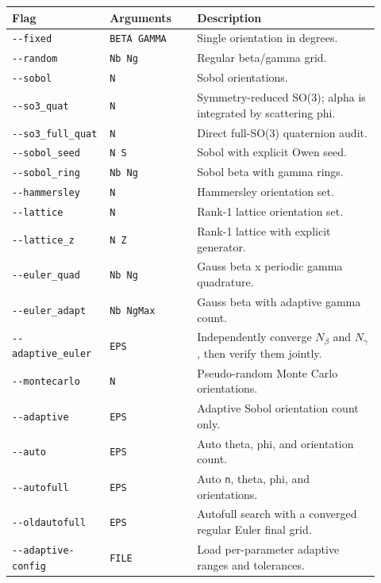 \documentclass[
  10pt,
  a4paper,
]{article}
\begin{document}
\begin{longtable}[]{@{}L{0.24\linewidth}L{0.22\linewidth}L{0.46\linewidth}@{}}
\toprule\noalign{}
Flag & Arguments & Description \\
\midrule\noalign{}
\endhead
\bottomrule\noalign{}
\endlastfoot
\texttt{-\/-fixed} & \texttt{BETA\ GAMMA} & Single orientation in
degrees. \\
\texttt{-\/-random} & \texttt{Nb\ Ng} & Regular beta/gamma grid. \\
\texttt{-\/-sobol} & \texttt{N} & Sobol orientations. \\
\texttt{-\/-so3\_quat} & \texttt{N} & Symmetry-reduced SO(3); alpha is
integrated by scattering phi. \\
\texttt{-\/-so3\_full\_quat} & \texttt{N} & Direct full-SO(3) quaternion
audit. \\
\texttt{-\/-sobol\_seed} & \texttt{N\ S} & Sobol with explicit Owen
seed. \\
\texttt{-\/-sobol\_ring} & \texttt{Nb\ Ng} & Sobol beta with gamma
rings. \\
\texttt{-\/-hammersley} & \texttt{N} & Hammersley orientation set. \\
\texttt{-\/-lattice} & \texttt{N} & Rank-1 lattice orientation set. \\
\texttt{-\/-lattice\_z} & \texttt{N\ Z} & Rank-1 lattice with explicit
generator. \\
\texttt{-\/-euler\_quad} & \texttt{Nb\ Ng} & Gauss beta x periodic gamma
quadrature. \\
\texttt{-\/-euler\_adapt} & \texttt{Nb\ NgMax} & Gauss beta with
adaptive gamma count. \\
\texttt{-\/-adaptive\_euler} & \texttt{EPS} & Independently converge
\(N_\beta\) and \(N_\gamma\), then verify them jointly. \\
\texttt{-\/-montecarlo} & \texttt{N} & Pseudo-random Monte Carlo
orientations. \\
\texttt{-\/-adaptive} & \texttt{EPS} & Adaptive Sobol orientation count
only. \\
\texttt{-\/-auto} & \texttt{EPS} & Auto theta, phi, and orientation
count. \\
\texttt{-\/-autofull} & \texttt{EPS} & Auto \texttt{n}, theta, phi, and
orientations. \\
\texttt{-\/-oldautofull} & \texttt{EPS} & Autofull search with a
converged regular Euler final grid. \\
\texttt{-\/-adaptive-config} & \texttt{FILE} & Load per-parameter
adaptive ranges and tolerances. \\

\end{longtable}
\end{document}

